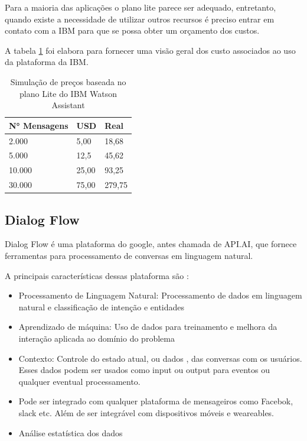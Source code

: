 Para a maioria das aplicações o plano lite parece ser adequado, entretanto, quando existe a necessidade de utilizar outros recursos é preciso entrar em contato com a IBM para que se possa obter um orçamento dos custos. 

A tabela \ref{tabela:simulacaoIBM} foi elabora para fornecer uma visão geral dos custo associados ao uso da plataforma da IBM.


\begin{table}[H]
    
    \begin{center}
    \begin{tabular}{| p{3cm}| p{3cm} | p{3cm}|}
     \hline
      N° Mensagens & USD & Real\\
    \hline
     2.000 & 5,00 &  18,68 \\
    
    \hline
     5.000 & 12,5 & 45,62  \\
    
    \hline
     10.000 & 25,00 & 93,25 \\
    
    \hline
     30.000 & 75,00 & 279,75\\
    \hline
   
   
    \end{tabular}
    \caption{Simulação de preços baseada no plano Lite do IBM Watson Assistant}
    \label{tabela:simulacaoIBM}
    \end{center}
   
\end{table}


\subsection{Dialog Flow}

Dialog Flow é uma plataforma do google, antes chamada de API.AI, que fornece ferramentas para processamento de conversas em linguagem natural. 

A principais características dessas plataforma são :

\begin{itemize}
    \item Processamento de Linguagem Natural: Processamento de dados em linguagem natural e classificação de intenção e entidades
    \item Aprendizado de máquina: Uso de dados para treinamento e melhora da interação aplicada ao domínio do problema
    \item Contexto: Controle do estado atual, ou dados , das conversas com os usuários. Esses dados podem ser usados como input ou output para eventos ou qualquer eventual processamento.
    \item Pode ser integrado com qualquer plataforma de mensageiros como Facebok, slack etc. Além de ser integrável com dispositivos móveis e weareables.
    \item Análise estatística dos dados 
\end{itemize}


